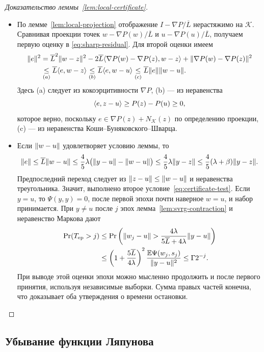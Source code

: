 \begin{proof}[Доказательство леммы~\ref{lem:local-certificate}]
\leavevmode
\begin{itemize}
\item По лемме~\ref{lem:local-projection} отображение
$I-\nabla P/\overline L$ нерастяжимо на $\mathcal K$. Сравнивая
проекции точек $w-\nabla P(w)/\overline L$ и $u-\nabla P(u)/\overline L$,
получаем первую оценку в \eqref{eq:sharp-residual}. Для второй оценки имеем
\begin{align*}
 \lVert e\rVert^2&=\overline L^2\lVert w-z\rVert^2
 -2\overline L\langle \nabla P(w)-\nabla P(z),w-z\rangle
 +\lVert\nabla P(w)-\nabla P(z)\rVert^2
 \\&\mathrel{\underset{(a)}{\le}}\overline L\langle e,w-z\rangle
 \mathrel{\underset{(b)}{\le}}\overline L\langle e,w-u\rangle
 \mathrel{\underset{(c)}{\le}}\overline L\lVert e\rVert\lVert w-u\rVert.
\end{align*}
Здесь (a) следует из кокоэрцитивности $\nabla P$, (b) --- из неравенства
\[
 \langle e,z-u\rangle\ge P(z)-P(u)\ge0,
\]
которое верно, поскольку $e\in\nabla P(z)+N_{\mathcal K}(z)$
по определению проекции, (c) --- из неравенства
Коши--Буняковского--Шварца.
\item Если $\lVert w-u\rVert$ удовлетворяет условию леммы, то
\[
 \lVert e\rVert\le\overline L\lVert w-u\rVert
 \le\frac45\lambda\bigl(\lVert y-u\rVert-\lVert w-u\rVert\bigr)
 \le\frac45\lambda\lVert y-z\rVert
 \le\frac45(\lambda+\beta)\lVert y-z\rVert.
\]
Предпоследний переход следует из $\lVert z-u\rVert\le\lVert w-u\rVert$
и неравенства треугольника. Значит, выполнено второе
условие~\eqref{eq:certificate-test}.
Если $y=u$, то $\Psi(y,y)=0$, после первой эпохи почти наверное $w=u$,
и набор принимается. При $y\ne u$ после $j$ эпох
лемма~\ref{lem:svrg-contraction} и неравенство Маркова дают
\[
 \begin{aligned}
 \Pr(T_{\rm ep}>j)
 &\le\Pr\left(\lVert w_j-u\rVert>\frac{4\lambda}{5\overline L+4\lambda}\lVert y-u\rVert\right)\\
 &\le\left(1+\frac{5\overline L}{4\lambda}\right)^2
 \frac{\mathbb E\Psi(w_j,s_j)}{\lVert y-u\rVert^2}
 \le\Gamma2^{-j}.
 \end{aligned}
\]
При выводе этой оценки эпохи можно мысленно продолжить и после первого
принятия, используя независимые выборки. Сумма правых частей конечна, что доказывает
оба утверждения о времени остановки.
\end{itemize}
\end{proof}

\subsection{Убывание функции Ляпунова}\label{app:potential-proof}


